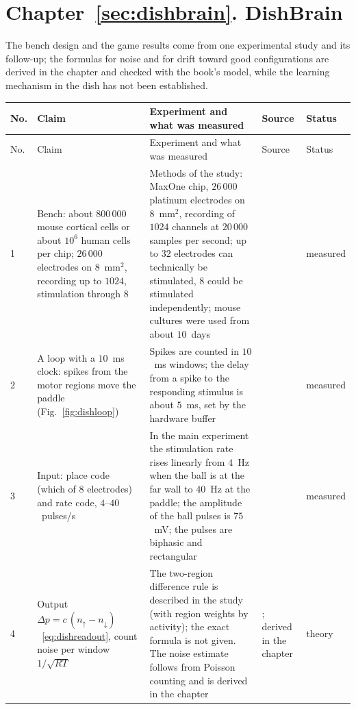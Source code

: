 \section{Chapter~\ref{sec:dishbrain}. DishBrain}

The bench design and the game results come from one experimental study and its follow-up; the formulas for noise and for drift toward good configurations are derived in the chapter and checked with the book's model, while the learning mechanism in the dish has not been established.

{\footnotesize
\setlength{\tabcolsep}{3pt}\renewcommand{\arraystretch}{1.15}
\begin{longtable}{>{\raggedright}p{0.5cm}>{\raggedright}p{4.0cm}>{\raggedright}p{5.6cm}>{\raggedright}p{2.3cm}>{\raggedright\arraybackslash}p{1.7cm}}
\toprule
No. & Claim & Experiment and what was measured & Source & Status \\
\midrule\endfirsthead
\toprule
No. & Claim & Experiment and what was measured & Source & Status \\
\midrule\endhead
1 & Bench: about $800\,000$ mouse cortical cells or about $10^6$ human cells per chip; $26\,000$ electrodes on $8$~mm$^2$, recording up to $1024$, stimulation through $8$ & Methods of the study: MaxOne chip, $26\,000$ platinum electrodes on $8$~mm$^2$, recording of $1024$ channels at $20\,000$ samples per second; up to $32$ electrodes can technically be stimulated, $8$ could be stimulated independently; mouse cultures were used from about $10$~days & \cite{Kagan2022} & measured \\
2 & A loop with a $10$~ms clock: spikes from the motor regions move the paddle (Fig.~\ref{fig:dishloop}) & Spikes are counted in $10$~ms windows; the delay from a spike to the responding stimulus is about $5$~ms, set by the hardware buffer & \cite{Kagan2022} & measured \\
3 & Input: place code (which of $8$ electrodes) and rate code, $4$--$40$~pulses/s & In the main experiment the stimulation rate rises linearly from $4$~Hz when the ball is at the far wall to $40$~Hz at the paddle; the amplitude of the ball pulses is $75$~mV; the pulses are biphasic and rectangular & \cite{Kagan2022} & measured \\
4 & Output $\Delta p=c\,(n_\uparrow-n_\downarrow)$~\eqref{eq:dishreadout}, count noise per window $1/\sqrt{RT}$ & The two-region difference rule is described in the study (with region weights by activity); the exact formula is not given. The noise estimate follows from Poisson counting and is derived in the chapter & \cite{Kagan2022}; derived in the chapter & theory \\

\end{longtable}}
